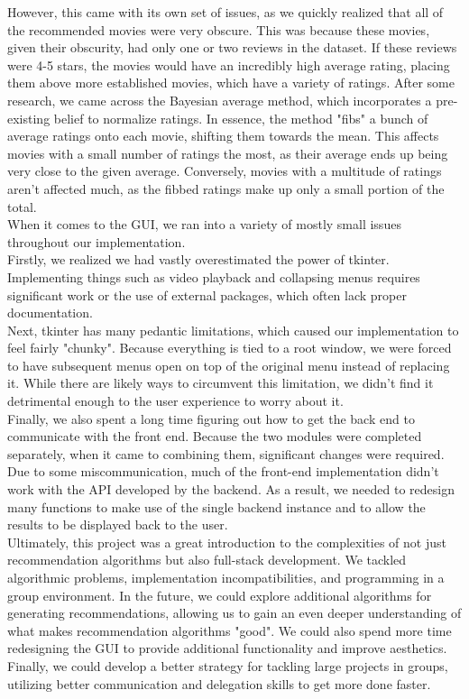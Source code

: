 \documentclass[12pt]{article}
\begin{document}
However, this came with its own set of issues, as we quickly realized that all of the recommended movies were very obscure. This was because these movies, given their obscurity, had only one or two reviews in the dataset. If these reviews were 4-5 stars, the movies would have an incredibly high average rating, placing them above more established movies, which have a variety of ratings. After some research, we came across the Bayesian average method, which incorporates a pre-existing belief to normalize ratings. In essence, the method "fibs" a bunch of average ratings onto each movie, shifting them towards the mean. This affects movies with a small number of ratings the most, as their average ends up being very close to the given average. Conversely, movies with a multitude of ratings aren't affected much, as the fibbed ratings make up only a small portion of the total. \\
When it comes to the GUI, we ran into a variety of mostly small issues throughout our implementation. \\
Firstly, we realized we had vastly overestimated the power of tkinter. Implementing things such as video playback and collapsing menus requires significant work or the use of external packages, which often lack proper documentation. \\
Next, tkinter has many pedantic limitations, which caused our implementation to feel fairly "chunky". Because everything is tied to a root window, we were forced to have subsequent menus open on top of the original menu instead of replacing it. While there are likely ways to circumvent this limitation, we didn't find it detrimental enough to the user experience to worry about it. \\
Finally, we also spent a long time figuring out how to get the back end to communicate with the front end. Because the two modules were completed separately, when it came to combining them, significant changes were required. Due to some miscommunication, much of the front-end implementation didn't work with the API developed by the backend. As a result, we needed to redesign many functions to make use of the single backend instance and to allow the results to be displayed back to the user. \\
Ultimately, this project was a great introduction to the complexities of not just recommendation algorithms but also full-stack development. We tackled algorithmic problems, implementation incompatibilities, and programming in a group environment. In the future, we could explore additional algorithms for generating recommendations, allowing us to gain an even deeper understanding of what makes recommendation algorithms "good". We could also spend more time redesigning the GUI to provide additional functionality and improve aesthetics. Finally, we could develop a better strategy for tackling large projects in groups, utilizing better communication and delegation skills to get more done faster.
\end{document}
